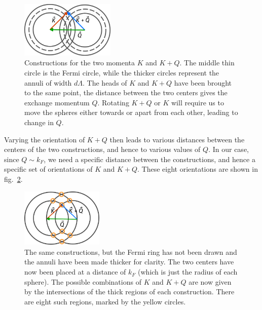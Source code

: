 \documentclass[12pt]{article}
\begin{document}
\begin{figure}[!htpb]
	\centering
	\includegraphics[width=0.4\textwidth]{./figures/overlap.pdf}
	\caption{Constructions for the two momenta \(K\) and \(K+Q\). The middle thin circle is the Fermi circle, while the thicker circles represent the annuli of width \(d\Lambda\). The heads of \(K\) and \(K+Q\) have been brought to the same point, the distance between the two centers gives the exchange momentum \(Q\). Rotating \(K+Q\) or \(K\) will require us to move the spheres either towards or apart from each other, leading to change in \(Q\).}
	\label{overlap}
\end{figure}

Varying the orientation of \(K+Q\) then leads to various distances between the centers of the two constructions, and hence to various values of \(Q\). In our case, since \(Q \sim k_F\), we need a specific distance between the constructions, and hence a specific set of orientations of \(K\) and \(K+Q\). These eight orientations are shown in fig.~\ref{overlap_survive}. 

\begin{figure}[!htpb]
	\centering
	\includegraphics[width=0.35\textwidth]{./figures/overlap_survive.pdf}
	\caption{The same constructions, but the Fermi ring has not been drawn and the annuli have been made thicker for clarity.  The two centers have now been placed at a distance of \(k_F\) (which is just the radius of each sphere). The possible combinations of \(K\) and \(K+Q\) are now given by the intersections of the thick regions of each construction. There are eight such regions, marked by the yellow circles.}
	\label{overlap_survive}
\end{figure}
\end{document}
